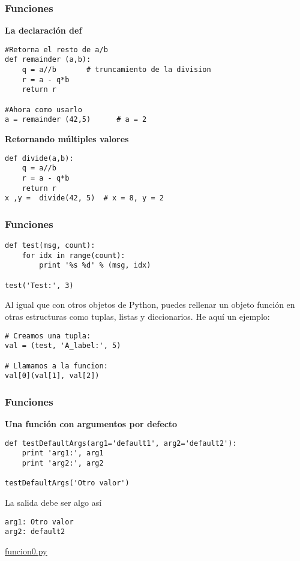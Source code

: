 \documentclass[10pt]{beamer}
\begin{document}
\begin{frame}[fragile]
\frametitle{Funciones}
\textbf{La declaraci\'on def }
\begin{lstlisting}
#Retorna el resto de a/b
def remainder (a,b):
    q = a//b       # truncamiento de la division
    r = a - q*b
    return r
    
#Ahora como usarlo
a = remainder (42,5)      # a = 2
\end{lstlisting}

\textbf{Retornando m\'ultiples valores}
\begin{lstlisting}
def divide(a,b):
    q = a//b
    r = a - q*b
    return r
x ,y =  divide(42, 5)  # x = 8, y = 2
\end{lstlisting}
\end{frame}

\begin{frame}[fragile]
\frametitle{Funciones}

\begin{lstlisting}
def test(msg, count):
    for idx in range(count):
        print '%s %d' % (msg, idx)

test('Test:', 3)
\end{lstlisting}


\vspace{0.3cm}

Al igual que con otros objetos de Python, puedes rellenar un objeto funci\'on en otras estructuras como tuplas, listas y diccionarios. He aqu\'i un ejemplo:

\vspace{0.3cm}

\begin{lstlisting}
# Creamos una tupla:
val = (test, 'A_label:', 5)

# Llamamos a la funcion:
val[0](val[1], val[2])
\end{lstlisting}
\end{frame}
\begin{frame}[fragile]
\frametitle{Funciones}
\textbf{Una funci\'on con argumentos por defecto}

\vspace{0.3cm}

\begin{lstlisting}
def testDefaultArgs(arg1='default1', arg2='default2'):
    print 'arg1:', arg1
    print 'arg2:', arg2

testDefaultArgs('Otro valor')
\end{lstlisting}


\vspace{0.3cm}

\footnotesize{La salida debe ser algo as\'i}

\vspace{0.3cm}

\begin{lstlisting}
arg1: Otro valor
arg2: default2
\end{lstlisting}
\href{run:funcion0.py}{\underline{funcion0.py}}
\end{frame}
\end{document}
